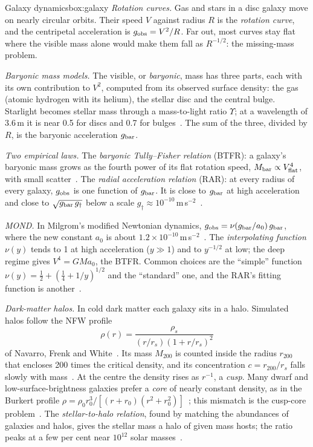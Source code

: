 \begin{primer}{Galaxy dynamics}{box:galaxy}
\setlength{\parskip}{3pt plus 1pt}%
\emph{Rotation curves.} Gas and stars in a disc galaxy move on nearly circular orbits. Their speed $V$ against radius $R$ is the
\emph{rotation curve}, and the centripetal acceleration is $g_{\rm obs}=V^2/R$. Far out, most curves stay flat where the visible mass alone
would make them fall as $R^{-1/2}$: the missing-mass problem.

\emph{Baryonic mass models.} The visible, or \emph{baryonic}, mass has three parts, each with its own contribution to $V^2$, computed from
its observed surface density: the gas (atomic hydrogen with its helium), the stellar disc and the central bulge. Starlight becomes stellar
mass through a mass-to-light ratio $\Upsilon$; at a wavelength of 3.6\,\textmu m it is near 0.5 for discs and 0.7 for
bulges~\cite{mcgaugh2016}. The sum of the three, divided by $R$, is the baryonic acceleration $g_{\rm bar}$.

\emph{Two empirical laws.} The \emph{baryonic Tully--Fisher relation} (BTFR): a galaxy's baryonic mass grows as the fourth power of its flat
rotation speed, $M_{\rm bar}\propto V_{\rm flat}^4$, with small scatter~\cite{lelli2016a}. The \emph{radial acceleration relation} (RAR): at
every radius of every galaxy, $g_{\rm obs}$ is one function of $g_{\rm bar}$. It is close to $g_{\rm bar}$ at high acceleration and close to
$\sqrt{g_{\rm bar}\,g_\dagger}$ below a scale $g_\dagger\approx10^{-10}$\,m\,s$^{-2}$~\cite{mcgaugh2016,lelli2017}.

\emph{MOND.} In Milgrom's modified Newtonian dynamics, $g_{\rm obs}=\nu(g_{\rm bar}/a_0)\,g_{\rm bar}$, where the new constant
$a_0$ is about $1.2\times10^{-10}$\,m\,s$^{-2}$~\cite{milgrom}. The \emph{interpolating function} $\nu(y)$ tends to 1 at high acceleration
($y\gg1$) and to $y^{-1/2}$ at low; the deep regime gives $V^4=GMa_0$, the BTFR. Common choices are the ``simple'' function
$\nu(y)=\tfrac12+(\tfrac14+1/y)^{1/2}$ and the ``standard'' one, and the RAR's fitting function is another~\cite{famaey2012}.

\emph{Dark-matter halos.} In cold dark matter each galaxy sits in a halo. Simulated halos follow the NFW profile
\[
\rho(r)=\frac{\rho_s}{(r/r_s)(1+r/r_s)^2}
\]
of Navarro, Frenk and White~\cite{navarro1996}. Its mass $M_{200}$ is counted inside the radius $r_{200}$ that encloses 200 times the
critical density, and its concentration $c=r_{200}/r_s$ falls slowly with mass~\cite{dutton2014}. At the centre the density rises as
$r^{-1}$, a \emph{cusp}. Many dwarf and low-surface-brightness galaxies prefer a \emph{core} of nearly constant density, as in the Burkert
profile $\rho=\rho_0r_0^3/[(r+r_0)(r^2+r_0^2)]$~\cite{burkert1995}; this mismatch is the cusp-core problem~\cite{deblok2010}. The
\emph{stellar-to-halo relation}, found by matching the abundances of galaxies and halos, gives the stellar mass a halo of given mass hosts;
the ratio peaks at a few per cent near $10^{12}$ solar masses~\cite{moster2013}.


\end{primer}
